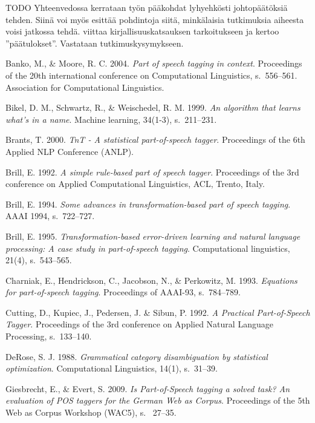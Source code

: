 \documentclass[utf8,bachelor,manualbib]{gradu3}
\begin{document}
TODO Yhteenvedossa kerrataan työn pääkohdat lyhyehkösti johtopäätöksiä tehden. Siinä voi myös esittää pohdintoja siitä, minkälaisia tutkimuksia aiheesta voisi jatkossa tehdä. viittaa kirjallisuuskatsauksen tarkoitukseen ja kertoo ''päätulokset''. Vastataan tutkimuskysymykseen.


\begin{thebibliography}{}

Banko, M., \& Moore, R. C. 2004. \textit{Part of speech tagging in context}. Proceedings of the 20th international conference on Computational Linguistics, s.~556--561. Association for Computational Linguistics.

Bikel, D. M., Schwartz, R., \& Weischedel, R. M. 1999. \textit{An algorithm that learns what's in a name}. Machine learning, 34(1-3), s.~211--231.

Brants, T. 2000. \textit{TnT - A statistical part-of-speech tagger}. Proceedings of the 6th Applied NLP Conference (ANLP).

Brill, E. 1992. \textit{A simple rule-based part of speech tagger}. Proceedings of the 3rd conference on Applied Computational Linguistics, ACL, Trento, Italy.

Brill, E. 1994. \textit{Some advances in transformation-based part of speech tagging}. AAAI 1994, s.~722--727.

Brill, E. 1995. \textit{Transformation-based error-driven learning and natural language processing: A case study in part-of-speech tagging}. Computational linguistics, 21(4), s.~543--565.

Charniak, E., Hendrickson, C., Jacobson, N., \& Perkowitz, M. 1993. \textit{Equations for part-of-speech tagging}. Proceedings of AAAI-93, s.~784--789.

Cutting, D., Kupiec, J., Pedersen, J. \& Sibun, P. 1992. \textit{A Practical Part-of-Speech Tagger}. Proceedings of the 3rd conference on Applied Natural Language Processing, s.~133--140.

DeRose, S. J. 1988. \textit{Grammatical category disambiguation by statistical optimization}. Computational Linguistics, 14(1), s.~31--39.

Giesbrecht, E., \& Evert, S. 2009. \textit{Is Part-of-Speech tagging a solved task? An evaluation of POS taggers for the German Web as Corpus}. Proceedings of the 5th Web as Corpus Workshop (WAC5), s.~ 27--35.


\end{thebibliography}
\end{document}
